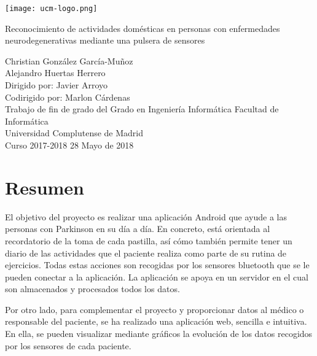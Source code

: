 \documentclass[11pt,spanish]{article}
\author{
\Large Christian González García-Muñoz \\ 
\Large Alejandro Huertas Herrero 
}
\date{}
\begin{document}
\begin{titlepage}
	\centering
    \texttt{[image: ucm-logo.png]}
    \vskip 1cm
    
    \centering
    {\huge Reconocimiento de actividades domésticas en personas con enfermedades neurodegenerativas mediante una pulsera de sensores 
    }
    \newline
    \newline
    \newline
    \newline
    
	\centering \large { Christian González García-Muñoz \\  Alejandro Huertas Herrero \\ 
    					\bigskip Dirigido por: Javier Arroyo \\ Codirigido por: Marlon Cárdenas \\ \bigskip}
    \vskip 1cm
    \centering \Large { Trabajo de fin de grado del Grado en Ingeniería Informática }
	\vskip 1cm
    \centering \large {Facultad de Informática \\ Universidad Complutense de Madrid \\ Curso 2017-2018}
    \vskip 0.5cm
    \centering \large {28 Mayo de 2018}

\end{titlepage}
\clearpage
\vphantom{a}
\newpage
\tableofcontents
\newpage
\section*{Resumen}
El objetivo del proyecto es realizar una aplicación Android que ayude a las personas con Parkinson en su día a día. En concreto, está orientada al recordatorio de la toma de cada pastilla, así cómo también permite tener un diario de las actividades que el paciente realiza como parte de su rutina de ejercicios. Todas estas acciones son recogidas por los sensores bluetooth que se le pueden conectar a la aplicación. La aplicación se apoya en un servidor en el cual son almacenados y procesados todos los datos.
\newline

Por otro lado, para complementar el proyecto y proporcionar datos al médico o responsable del paciente, se ha realizado una aplicación web, sencilla e intuitiva. En ella, se pueden visualizar mediante gráficos la evolución de los datos recogidos por los sensores de cada paciente.
\newline
\end{document}
